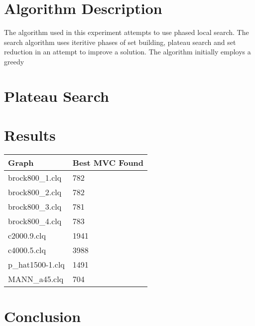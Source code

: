 \documentclass[conference,letterpaper]{IEEEtran}
\begin{document}
\section{Algorithm Description}
The algorithm used in this experiment attempts to use phased local search. The search algorithm uses iteritive phases of set building, plateau search and set reduction in an attempt to improve a solution. The algorithm initially employs a greedy 

\section{Plateau Search}

\newpage
\section{Results}
\begin{table}[!h]
    \begin{tabular}{ll}
    \textbf{Graph}   & \textbf{Best MVC Found} \\ \hline
    brock800\_1.clq  & 782                     \\
    brock800\_2.clq  & 782                     \\
    brock800\_3.clq  & 781                     \\
    brock800\_4.clq  & 783                     \\
    c2000.9.clq      & 1941                    \\
    c4000.5.clq      & 3988                    \\
    p\_hat1500-1.clq & 1491                    \\
    MANN\_a45.clq    & 704                    
    \end{tabular}
\end{table}

\section{Conclusion}

\clearpage




%
%
\end{document}
